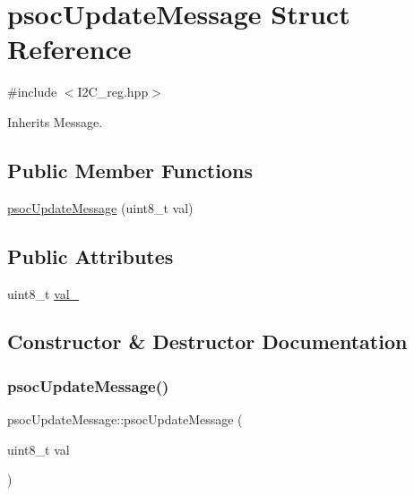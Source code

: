 \hypertarget{structpsoc_update_message}{}\section{psoc\+Update\+Message Struct Reference}
\label{structpsoc_update_message}


{\ttfamily \#include $<$I2\+C\+\_\+reg.\+hpp$>$}



Inherits Message.

\subsection*{Public Member Functions}
\begin{DoxyCompactItemize}
\item 
\hyperlink{structpsoc_update_message_a05c93819cbf802cbdf85c88085b688a5}{psoc\+Update\+Message} (uint8\+\_\+t val)
\end{DoxyCompactItemize}
\subsection*{Public Attributes}
\begin{DoxyCompactItemize}
\item 
uint8\+\_\+t \hyperlink{structpsoc_update_message_a79436a9bab15bac4c80de00eedd35c50}{val\+\_\+}
\end{DoxyCompactItemize}


\subsection{Constructor \& Destructor Documentation}
\mbox{\label{structpsoc_update_message_a05c93819cbf802cbdf85c88085b688a5}} 
\subsubsection{\texorpdfstring{psoc\+Update\+Message()}{psocUpdateMessage()}}
{\footnotesize\ttfamily psoc\+Update\+Message\+::psoc\+Update\+Message (\begin{DoxyParamCaption}\item[{uint8\+\_\+t}]{val }\end{DoxyParamCaption})\hspace{0.3cm}{\ttfamily [inline]}}



